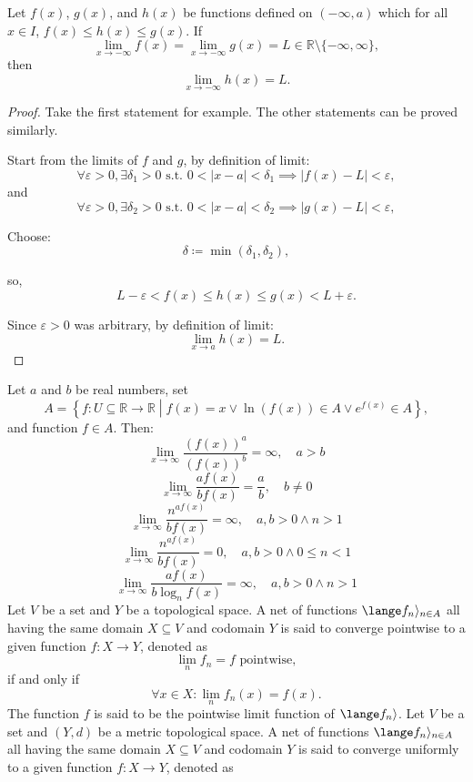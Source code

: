 \documentclass[a4paper,12pt]{report}
\begin{document}
Let $f(x)$, $g(x)$, and $h(x)$ be functions defined on $(-\infty,a)$ which for all $x\in I$, $f(x)\leq h(x)\leq g(x)$. If
\[\lim_{x\to-\infty}f(x)=\lim_{x\to-\infty}g(x)=L\in\mathbb{R}\setminus\{-\infty,\infty\},\]
then
\[\lim_{x\to-\infty}h(x)=L.\]
\begin{proof}
Take the first statement for example. The other statements can be proved similarly.

Start from the limits of $f$ and $g$, by definition of limit:
\[\forall\varepsilon>0, \exists\delta_1>0\text{\ s.t.\ }0<|x-a|<\delta_1\implies|f(x)-L|<\varepsilon,\]
and
\[\forall\varepsilon>0, \exists\delta_2>0\text{\ s.t.\ }0<|x-a|<\delta_2\implies|g(x)-L|<\varepsilon,\]

Choose:
\[\delta\coloneq\min(\delta_1,\delta_2),\]

so,
\[L-\varepsilon<f(x)\leq h(x)\leq g(x)<L+\varepsilon.\]

Since $\varepsilon > 0$ was arbitrary, by definition of limit:
\[\lim_{x\to a}h(x)=L.\]
\end{proof}
Let \( a \) and \( b \) be real numbers, set
\[A=\left\{f\colon U\subseteq\mathbb{R}\to\mathbb{R} \middle | f(x) = x \lor \ln(f(x)) \in A \lor e^{f\left(x\right)}  \in A \right\},\]
and function $f\in A$. Then:
\[\lim_{x \to \infty} \frac{\left(f\left(x\right)\right)^a}{\left(f\left(x\right)\right)^b} = \infty, \quad a > b \]
\[ \lim_{x \to \infty} \frac{af\left(x\right)}{bf\left(x\right)} = \frac{a}{b}, \quad b \neq 0 \]
\[ \lim_{x \to \infty}\frac{n^{af\left(x\right)}}{bf\left(x\right)} = \infty, \quad a,b > 0 \land  n > 1 \]
\[ \lim_{x \to \infty}\frac{n^{af\left(x\right)}}{bf\left(x\right)} = 0, \quad a,b > 0 \land  0\leq n<1 \]
\[ \lim_{x \to \infty}\frac{af\left(x\right)}{b\log_n f\left(x\right)} = \infty, \quad a,b > 0 \land  n > 1 \]
Let $V$ be a set and $Y$ be a topological space. A net of functions $\lange f_n\rangle_{n\in A}$ all having the same domain $X\subseteq V$ and codomain $Y$ is said to converge pointwise to a given function $f\colon X\to Y$, denoted as 
\[\lim_nf_n=f\text{\ pointwise},\]
if and only if
\[\forall x\in X\colon\lim_nf_n(x)=f(x).\]
The function $f$ is said to be the pointwise limit function of $\lange f_n\rangle$.
Let $V$ be a set and $(Y,d)$ be a metric topological space. A net of functions $\lange f_n\rangle_{n\in A}$ all having the same domain $X\subseteq V$ and codomain $Y$ is said to converge uniformly to a given function $f\colon X\to Y$, denoted as 
\end{document}
